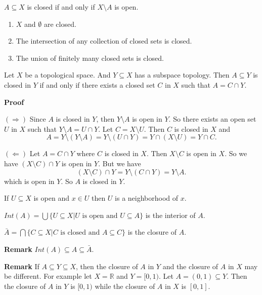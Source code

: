 \documentclass[main.tex]{subfiles}
\begin{document}
\begin{definition}
    $A \subseteq X$ is closed if and only if \(X \setminus A\) is open. 
\end{definition}
\begin{property}
    \begin{enumerate}
        \item $X$ and $\emptyset$ are closed.
        \item The intersection of any collection of closed sets is closed.
        \item The union of finitely many closed sets is closed.
    \end{enumerate}
\end{property}
\begin{theorem}
    Let $X$ be a topological space. And $Y \subseteq X$ has a subspace topology. Then $A \subseteq Y$ is closed in $Y$ if and only if there exists a closed set $C$ in $X$ such that \(A = C \cap Y\).
\end{theorem}
\par \noindent \textbf{Proof} 
\par \((\Rightarrow)\) Since $A$ is closed in $Y$, then \(Y \setminus A\) is open in $Y$. So there exists an open set $U$ in $X$ such that \(Y \setminus A = U \cap Y\). Let \(C = X \setminus U\). Then $C$ is closed in $X$ and
\[
    A = Y \setminus (Y \setminus A) = Y \setminus (U \cap Y) = Y \cap (X \setminus U) = Y \cap C.
\]
\par \((\Leftarrow)\) Let $A = C \cap Y$ where $C$ is closed in $X$. Then \(X \setminus C\) is open in $X$. So we have
$ (X \setminus C) \cap Y$ is open in $Y$. But we have 
\begin{equation}
    (X \setminus C) \cap Y = Y \setminus (C \cap Y) = Y \setminus A.
\end{equation}
which is open in $Y$. So $A$ is closed in $Y$.

\begin{definition}
    If $U \subseteq X$ is open and $x \in U$ then $U$ is a neighborhood of $x$.
\end{definition}
\begin{definition}
    $Int(A) = \bigcup \{U \subseteq X | U \text{ is open and } U \subseteq A\}$ is the interior of $A$. 
    \par 
    $\bar{A} = \bigcap \{C \subseteq X | C \text{ is closed and } A \subseteq C\}$ is the closure of $A$.
\end{definition}
\par \noindent \textbf{Remark} $Int(A) \subseteq A \subseteq \bar{A}$. 
\par \noindent \textbf{Remark} If $A \subseteq Y \subseteq X$, then the closure of $A$ in $Y$ and the closure of $A$ in $X$ may be different. For example let $X = \mathbb{R}$ and $Y = [0, 1)$. Let $A = (0, 1) \subseteq Y$. Then the closure of $A$ in $Y$ is $[0, 1)$ while the closure of $A$ in $X$ is $[0, 1]$. 
\end{document}
